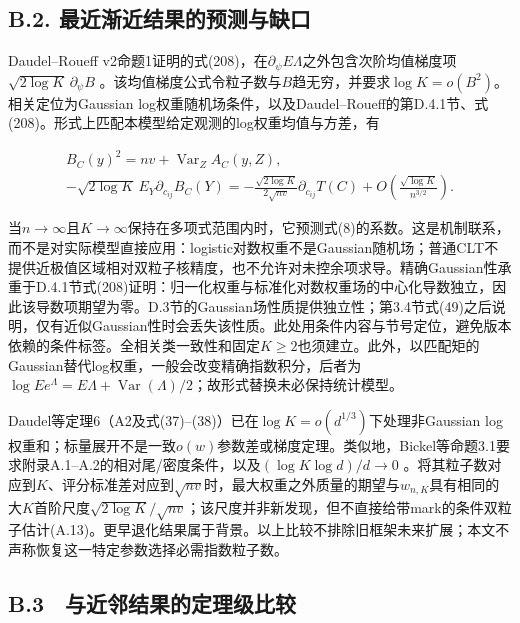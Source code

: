 \documentclass[11pt,a4paper]{article}
\begin{document}
\subsection*{B.2.
最近渐近结果的预测与缺口}\label{b.2.-ux6700ux8fd1ux6e10ux8fd1ux7ed3ux679cux7684ux9884ux6d4bux4e0eux7f3aux53e3}

Daudel--Roueff
v2命题1证明的式(208)，在\(\partial_\psi E\Lambda\)之外包含次阶均值梯度项\(\sqrt{2\log K}\,\partial_\psi B\)
\citep{daudel2026}。该均值梯度公式令粒子数与\(B\)趋无穷，并要求\(\log K=o(B^2)\)。相关定位为Gaussian
log权重随机场条件，以及Daudel--Roueff的第D.4.1节、式(208)。形式上匹配本模型给定观测的log权重均值与方差，有

\[
\begin{gathered}
B_C(y)^2=nv+\operatorname{Var}_Z A_C(y,Z),\\
-\sqrt{2\log K}\,E_Y\partial_{c_{ij}}B_C(Y)
=-\frac{\sqrt{2\log K}}{2\sqrt{nv}}\partial_{c_{ij}}T(C)+O\!\left(\frac{\sqrt{\log K}}{n^{3/2}}\right).
\end{gathered}
\tag{B.3}
\]

当\(n\to\infty\)且\(K\to\infty\)保持在多项式范围内时，它预测式(8)的系数。这是机制联系，而不是对实际模型直接应用：logistic对数权重不是Gaussian随机场；普通CLT不提供近极值区域相对双粒子核精度，也不允许对未控余项求导。精确Gaussian性承重于D.4.1节式(208)证明：归一化权重与标准化对数权重场的中心化导数独立，因此该导数项期望为零。D.3节的Gaussian场性质提供独立性；第3.4节式(49)之后说明，仅有近似Gaussian性时会丢失该性质。此处用条件内容与节号定位，避免版本依赖的条件标签。全相关类一致性和固定\(K\ge2\)也须建立。此外，以匹配矩的Gaussian替代log权重，一般会改变精确指数积分，后者为\(\log E e^\Lambda=E\Lambda+\operatorname{Var}(\Lambda)/2\)；故形式替换未必保持统计模型。

Daudel等定理6（A2及式(37)--(38)）已在\(\log K=o(d^{1/3})\)下处理非Gaussian
log权重和\citep{daudel2023}；标量展开不是一致\(o(w)\)参数差或梯度定理。类似地，Bickel等命题3.1要求附录A.1--A.2的相对尾/密度条件，以及\((\log K\log d)/d\to0\)
\citep{bickel2008}。将其粒子数对应到\(K\)、评分标准差对应到\(\sqrt{nv}\)时，最大权重之外质量的期望与\(w_{n,K}\)具有相同的大\(K\)首阶尺度\(\sqrt{2\log K}/\sqrt{nv}\)；该尺度并非新发现，但不直接给带mark的条件双粒子估计(A.13)。更早退化结果\citep{bengtsson2008, snyder2008}属于背景。以上比较不排除旧框架未来扩展；本文不声称恢复这一特定参数选择必需指数粒子数。

\subsection*{B.3　与近邻结果的定理级比较}\label{b.3-ux4e0eux8fd1ux90bbux7ed3ux679cux7684ux5b9aux7406ux7ea7ux6bd4ux8f83}
\end{document}
